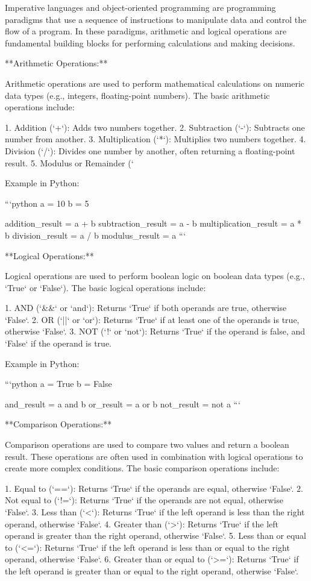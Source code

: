 \documentclass{article}
\begin{document}
Imperative languages and object-oriented programming are programming paradigms that use a sequence of instructions to manipulate data and control the flow of a program. In these paradigms, arithmetic and logical operations are fundamental building blocks for performing calculations and making decisions.

**Arithmetic Operations:**

Arithmetic operations are used to perform mathematical calculations on numeric data types (e.g., integers, floating-point numbers). The basic arithmetic operations include:

1. Addition (`+`): Adds two numbers together.
2. Subtraction (`-`): Subtracts one number from another.
3. Multiplication (`*`): Multiplies two numbers together.
4. Division (`/`): Divides one number by another, often returning a floating-point result.
5. Modulus or Remainder (`%

Example in Python:

```python
a = 10
b = 5

addition_result = a + b
subtraction_result = a - b
multiplication_result = a * b
division_result = a / b
modulus_result = a %
```

**Logical Operations:**

Logical operations are used to perform boolean logic on boolean data types (e.g., `True` or `False`). The basic logical operations include:

1. AND (`&&` or `and`): Returns `True` if both operands are true, otherwise `False`.
2. OR (`||` or `or`): Returns `True` if at least one of the operands is true, otherwise `False`.
3. NOT (`!` or `not`): Returns `True` if the operand is false, and `False` if the operand is true.

Example in Python:

```python
a = True
b = False

and_result = a and b
or_result = a or b
not_result = not a
```

**Comparison Operations:**

Comparison operations are used to compare two values and return a boolean result. These operations are often used in combination with logical operations to create more complex conditions. The basic comparison operations include:

1. Equal to (`==`): Returns `True` if the operands are equal, otherwise `False`.
2. Not equal to (`!=`): Returns `True` if the operands are not equal, otherwise `False`.
3. Less than (`<`): Returns `True` if the left operand is less than the right operand, otherwise `False`.
4. Greater than (`>`): Returns `True` if the left operand is greater than the right operand, otherwise `False`.
5. Less than or equal to (`<=`): Returns `True` if the left operand is less than or equal to the right operand, otherwise `False`.
6. Greater than or equal to (`>=`): Returns `True` if the left operand is greater than or equal to the right operand, otherwise `False`.
\end{document}
